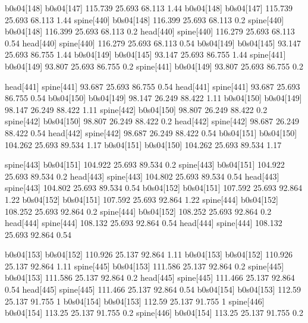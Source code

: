 b0s04[148]    b0s04[147]    115.739    25.693    68.113    1.44
b0s04[148]    b0s04[147]    115.739    25.693    68.113    1.44
spine[440]    b0s04[148]    116.399    25.693    68.113    0.2
spine[440]    b0s04[148]    116.399    25.693    68.113    0.2
head[440]    spine[440]    116.279    25.693    68.113    0.54
head[440]    spine[440]    116.279    25.693    68.113    0.54
b0s04[149]    b0s04[145]    93.147    25.693    86.755    1.44
b0s04[149]    b0s04[145]    93.147    25.693    86.755    1.44
spine[441]    b0s04[149]    93.807    25.693    86.755    0.2
spine[441]    b0s04[149]    93.807    25.693    86.755    0.2


head[441]    spine[441]    93.687    25.693    86.755    0.54
head[441]    spine[441]    93.687    25.693    86.755    0.54
b0s04[150]    b0s04[149]    98.147    26.249    88.422    1.11
b0s04[150]    b0s04[149]    98.147    26.249    88.422    1.11
spine[442]    b0s04[150]    98.807    26.249    88.422    0.2
spine[442]    b0s04[150]    98.807    26.249    88.422    0.2
head[442]    spine[442]    98.687    26.249    88.422    0.54
head[442]    spine[442]    98.687    26.249    88.422    0.54
b0s04[151]    b0s04[150]    104.262    25.693    89.534    1.17
b0s04[151]    b0s04[150]    104.262    25.693    89.534    1.17


spine[443]    b0s04[151]    104.922    25.693    89.534    0.2
spine[443]    b0s04[151]    104.922    25.693    89.534    0.2
head[443]    spine[443]    104.802    25.693    89.534    0.54
head[443]    spine[443]    104.802    25.693    89.534    0.54
b0s04[152]    b0s04[151]    107.592    25.693    92.864    1.22
b0s04[152]    b0s04[151]    107.592    25.693    92.864    1.22
spine[444]    b0s04[152]    108.252    25.693    92.864    0.2
spine[444]    b0s04[152]    108.252    25.693    92.864    0.2
head[444]    spine[444]    108.132    25.693    92.864    0.54
head[444]    spine[444]    108.132    25.693    92.864    0.54


b0s04[153]    b0s04[152]    110.926    25.137    92.864    1.11
b0s04[153]    b0s04[152]    110.926    25.137    92.864    1.11
spine[445]    b0s04[153]    111.586    25.137    92.864    0.2
spine[445]    b0s04[153]    111.586    25.137    92.864    0.2
head[445]    spine[445]    111.466    25.137    92.864    0.54
head[445]    spine[445]    111.466    25.137    92.864    0.54
b0s04[154]    b0s04[153]    112.59    25.137    91.755    1
b0s04[154]    b0s04[153]    112.59    25.137    91.755    1
spine[446]    b0s04[154]    113.25    25.137    91.755    0.2
spine[446]    b0s04[154]    113.25    25.137    91.755    0.2


